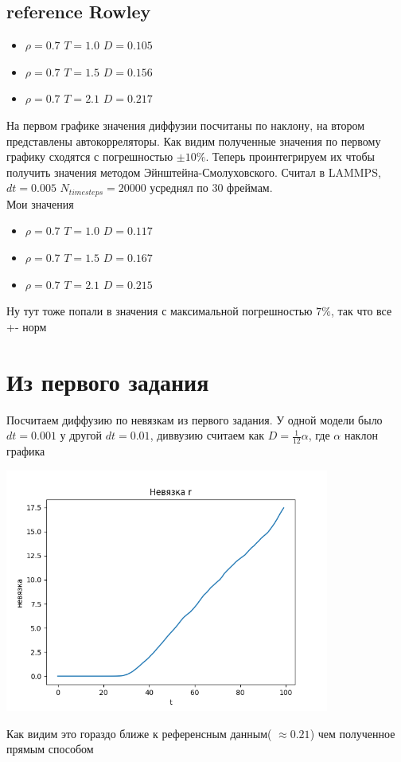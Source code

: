 \documentclass[a4paper]{article}
\begin{document}
\subsection*{reference Rowley}
\begin{itemize}
    \item $\rho = 0.7$ $T = 1.0$ $D = 0.105$
    \item $\rho = 0.7$ $T = 1.5$ $D = 0.156$
    \item $\rho = 0.7$ $T = 2.1$ $D = 0.217$
\end{itemize}
На первом графике значения диффузии посчитаны по наклону, на втором представлены автокорреляторы. Как видим полученные значения по первому графику сходятся с погрешностью $\pm 10\%$. Теперь проинтегрируем их чтобы получить значения методом Эйнштейна-Смолуховского. Считал в LAMMPS, $dt = 0.005$ $N_{timesteps} = 20000$  усреднял по 30 фреймам. \\
Мои значения
\begin{itemize}
    \item $\rho = 0.7$ $T = 1.0$ $D = 0.117$
    \item $\rho = 0.7$ $T = 1.5$ $D = 0.167$
    \item $\rho = 0.7$ $T = 2.1$ $D = 0.215$
\end{itemize}
Ну тут тоже попали в значения с максимальной погрешностью $7\%$, так что все +- норм 





\section{Из первого задания} %
\label{sec:из_первого_задания}
Посчитаем диффузию по невязкам из первого задания. У одной модели было $dt = 0.001$ у другой $dt = 0.01$, диввузию считаем как $D = \frac{1}{12}\alpha$, где $\alpha$ наклон графика
\begin{center}
\includegraphics[width=0.8\textwidth]{rdiv.png}
\end{center}
Как видим это гораздо ближе к референсным данным( $\approx 0.21$) чем полученное прямым способом
\end{document}
